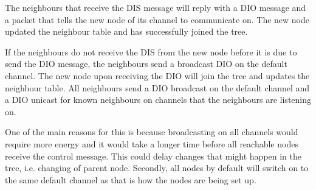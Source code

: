 The neighbours that receive the DIS message will reply with a DIO message and a packet that tells the new node of its channel to communicate on. The new node updated the neighbour table and has successfully joined the tree. 

If the neighbours do not receive the DIS from the new node before it is due to send the DIO message, the neighbours send a broadcast DIO on the default channel. The new node upon receiving the DIO will join the tree and updates the neighbour table. All neighbours send a DIO broadcast on the default channel and a DIO unicast for known neighbours on channels that the neighbours are listening on. 

One of the main reasons for this is because broadcasting on all channels would require more energy and it would take a longer time before all reachable nodes receive the control message. This could delay changes that might happen in the tree, i.e. changing of parent node. Secondly, all nodes by default will switch on to the same default channel as that is how the nodes are being set up. 







